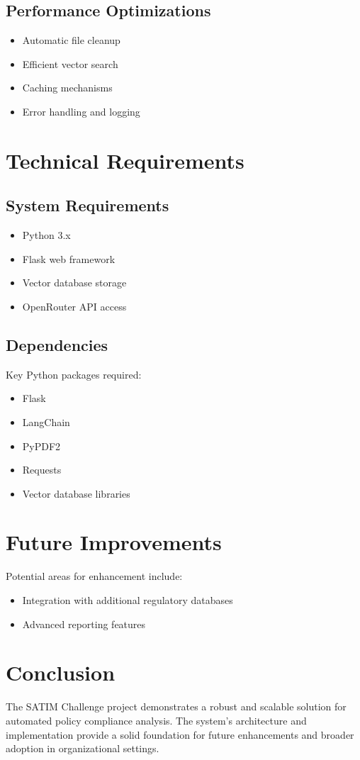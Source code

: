 \documentclass[11pt,a4paper]{article}
\begin{document}
\subsection{Performance Optimizations}
\begin{itemize}
    \item Automatic file cleanup
    \item Efficient vector search
    \item Caching mechanisms
    \item Error handling and logging
\end{itemize}

\section{Technical Requirements}
\subsection{System Requirements}
\begin{itemize}
    \item Python 3.x
    \item Flask web framework
    \item Vector database storage
    \item OpenRouter API access
\end{itemize}

\subsection{Dependencies}
Key Python packages required:
\begin{itemize}
    \item Flask
    \item LangChain
    \item PyPDF2
    \item Requests
    \item Vector database libraries
\end{itemize}

\section{Future Improvements}
Potential areas for enhancement include:
\begin{itemize}
    \item Integration with additional regulatory databases
    \item Advanced reporting features
\end{itemize}

\section{Conclusion}
    The SATIM Challenge project demonstrates a robust and scalable solution for automated policy compliance analysis. The system's architecture and implementation provide a solid foundation for future enhancements and broader adoption in organizational settings.
\end{document}
